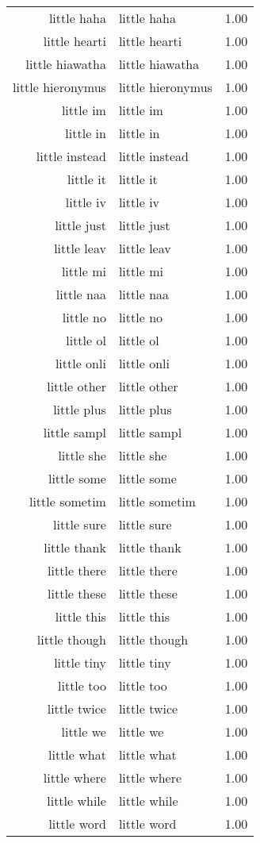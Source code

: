 \begin{table}[ht]
\begin{tabular}{rlr}
  little haha & little haha & 1.00 \\ 
  little hearti & little hearti & 1.00 \\ 
  little hiawatha & little hiawatha & 1.00 \\ 
  little hieronymus & little hieronymus & 1.00 \\ 
  little im & little im & 1.00 \\ 
  little in & little in & 1.00 \\ 
  little instead & little instead & 1.00 \\ 
  little it & little it & 1.00 \\ 
  little iv & little iv & 1.00 \\ 
  little just & little just & 1.00 \\ 
  little leav & little leav & 1.00 \\ 
  little mi & little mi & 1.00 \\ 
  little naa & little naa & 1.00 \\ 
  little no & little no & 1.00 \\ 
  little ol & little ol & 1.00 \\ 
  little onli & little onli & 1.00 \\ 
  little other & little other & 1.00 \\ 
  little plus & little plus & 1.00 \\ 
  little sampl & little sampl & 1.00 \\ 
  little she & little she & 1.00 \\ 
  little some & little some & 1.00 \\ 
  little sometim & little sometim & 1.00 \\ 
  little sure & little sure & 1.00 \\ 
  little thank & little thank & 1.00 \\ 
  little there & little there & 1.00 \\ 
  little these & little these & 1.00 \\ 
  little this & little this & 1.00 \\ 
  little though & little though & 1.00 \\ 
  little tiny & little tiny & 1.00 \\ 
  little too & little too & 1.00 \\ 
  little twice & little twice & 1.00 \\ 
  little we & little we & 1.00 \\ 
  little what & little what & 1.00 \\ 
  little where & little where & 1.00 \\ 
  little while & little while & 1.00 \\ 
  little word & little word & 1.00 \\ 
   \hline
\end{tabular}
\end{table}
